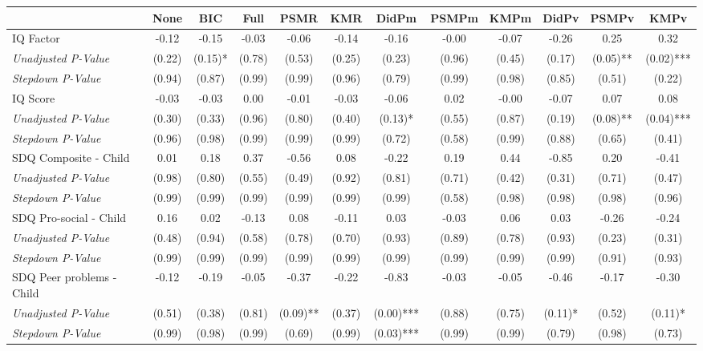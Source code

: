 \begin{tabular}{l c c c c c c c c c c c}
\toprule
 & None & BIC & Full & PSMR & KMR & DidPm & PSMPm & KMPm & DidPv & PSMPv & KMPv \\
\midrule
IQ Factor & -0.12 & -0.15 & -0.03 & -0.06 & -0.14 & -0.16 & -0.00 & -0.07 & -0.26 & 0.25 & 0.32 \\
\quad \textit{Unadjusted P-Value} & (0.22) & (0.15)* & (0.78) & (0.53) & (0.25) & (0.23) & (0.96) & (0.45) & (0.17) & (0.05)** & (0.02)*** \\
\quad \textit{Stepdown P-Value} & (0.94) & (0.87) & (0.99) & (0.99) & (0.96) & (0.79) & (0.99) & (0.98) & (0.85) & (0.51) & (0.22) \\
IQ Score & -0.03 & -0.03 & 0.00 & -0.01 & -0.03 & -0.06 & 0.02 & -0.00 & -0.07 & 0.07 & 0.08 \\
\quad \textit{Unadjusted P-Value} & (0.30) & (0.33) & (0.96) & (0.80) & (0.40) & (0.13)* & (0.55) & (0.87) & (0.19) & (0.08)** & (0.04)*** \\
\quad \textit{Stepdown P-Value} & (0.96) & (0.98) & (0.99) & (0.99) & (0.99) & (0.72) & (0.58) & (0.99) & (0.88) & (0.65) & (0.41) \\
SDQ Composite - Child & 0.01 & 0.18 & 0.37 & -0.56 & 0.08 & -0.22 & 0.19 & 0.44 & -0.85 & 0.20 & -0.41 \\
\quad \textit{Unadjusted P-Value} & (0.98) & (0.80) & (0.55) & (0.49) & (0.92) & (0.81) & (0.71) & (0.42) & (0.31) & (0.71) & (0.47) \\
\quad \textit{Stepdown P-Value} & (0.99) & (0.99) & (0.99) & (0.99) & (0.99) & (0.99) & (0.58) & (0.98) & (0.98) & (0.98) & (0.96) \\
SDQ Pro-social - Child & 0.16 & 0.02 & -0.13 & 0.08 & -0.11 & 0.03 & -0.03 & 0.06 & 0.03 & -0.26 & -0.24 \\
\quad \textit{Unadjusted P-Value} & (0.48) & (0.94) & (0.58) & (0.78) & (0.70) & (0.93) & (0.89) & (0.78) & (0.93) & (0.23) & (0.31) \\
\quad \textit{Stepdown P-Value} & (0.99) & (0.99) & (0.99) & (0.99) & (0.99) & (0.99) & (0.99) & (0.99) & (0.99) & (0.91) & (0.93) \\
SDQ Peer problems - Child & -0.12 & -0.19 & -0.05 & -0.37 & -0.22 & -0.83 & -0.03 & -0.05 & -0.46 & -0.17 & -0.30 \\
\quad \textit{Unadjusted P-Value} & (0.51) & (0.38) & (0.81) & (0.09)** & (0.37) & (0.00)*** & (0.88) & (0.75) & (0.11)* & (0.52) & (0.11)* \\
\quad \textit{Stepdown P-Value} & (0.99) & (0.98) & (0.99) & (0.69) & (0.99) & (0.03)*** & (0.99) & (0.99) & (0.79) & (0.98) & (0.73) \\

\end{tabular}
